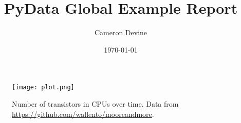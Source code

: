 \documentclass[12pt]{IEEEtran}
\title{PyData Global Example Report}
\author{Cameron Devine}
\date\today
\begin{document}
  \maketitle

  \lipsum[1]

  \begin{figure}
    \texttt{[image: plot.png]}
    \caption{Number of transistors in CPUs over time. Data from \url{https://github.com/wallento/mooreandmore}.}
  \end{figure}

  \lipsum[2-4]
\end{document}
